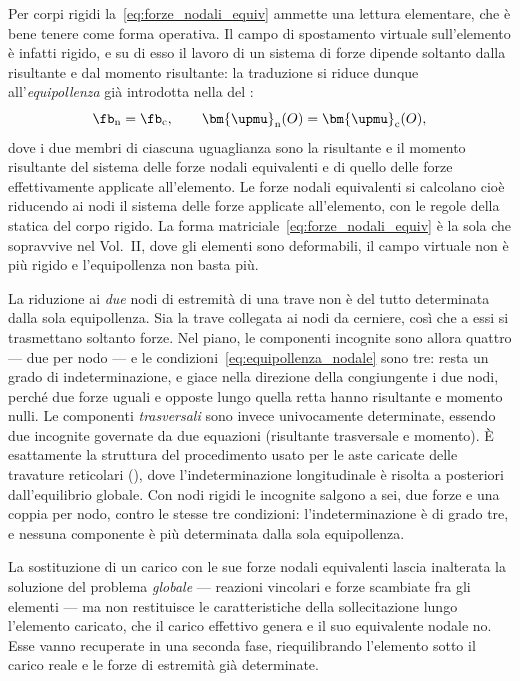 Per corpi rigidi la~\eqref{eq:forze_nodali_equiv} ammette
una lettura elementare, che è bene tenere come forma
operativa. Il campo di spostamento virtuale sull'elemento
è infatti rigido, e su di esso il lavoro di un sistema di
forze dipende soltanto dalla risultante e dal momento
risultante: la traduzione si riduce dunque
all'\emph{equipollenza} già introdotta nella
 del :
\begin{equation}\label{eq:equipollenza_nodale}
	\fb_{\mathrm{n}} = \fb_{\mathrm{c}} , \qquad
	\bm{\upmu}_{\mathrm{n}}(O) = \bm{\upmu}_{\mathrm{c}}(O) ,
\end{equation}
dove i due membri di ciascuna uguaglianza sono la
risultante e il momento risultante del sistema delle forze
nodali equivalenti e di quello delle forze effettivamente
applicate all'elemento.
Le forze nodali equivalenti si calcolano cioè riducendo ai
nodi il sistema delle forze applicate all'elemento, con le
regole della statica del corpo rigido. La forma
matriciale~\eqref{eq:forze_nodali_equiv} è la sola che
sopravvive nel Vol.~II, dove gli elementi sono deformabili,
il campo virtuale non è più rigido e l'equipollenza non
basta più.

\begin{oss}
	La riduzione ai \emph{due} nodi di estremità di una trave
	non è del tutto determinata dalla sola equipollenza. Sia
	la trave collegata ai nodi da cerniere, così che a essi
	si trasmettano soltanto forze. Nel piano, le componenti
	incognite sono allora quattro --- due per nodo --- e le
	condizioni~\eqref{eq:equipollenza_nodale} sono tre: resta
	un grado di indeterminazione, e giace
	nella direzione della congiungente i due nodi, perché due
	forze uguali e opposte lungo quella retta hanno risultante
	e momento nulli. Le componenti \emph{trasversali} sono
	invece univocamente determinate, essendo due incognite
	governate da due equazioni (risultante trasversale e
	momento). È esattamente la struttura del procedimento
	usato per le aste caricate delle travature reticolari
	(), dove l'indeterminazione
	longitudinale è risolta a posteriori dall'equilibrio
	globale. Con nodi rigidi le incognite salgono a sei, due
	forze e una coppia per nodo, contro le stesse tre
	condizioni: l'indeterminazione è di grado tre, e nessuna
	componente è più determinata dalla sola equipollenza.
\end{oss}

\begin{oss}
	La sostituzione di un carico con le sue forze nodali
	equivalenti lascia inalterata la soluzione del problema
	\emph{globale} --- reazioni vincolari e forze scambiate
	fra gli elementi --- ma non restituisce le caratteristiche
	della sollecitazione lungo l'elemento caricato, che il
	carico effettivo genera e il suo equivalente nodale no.
	Esse vanno recuperate in una seconda fase, riequilibrando
	l'elemento sotto il carico reale e le forze di estremità
	già determinate.
\end{oss}


